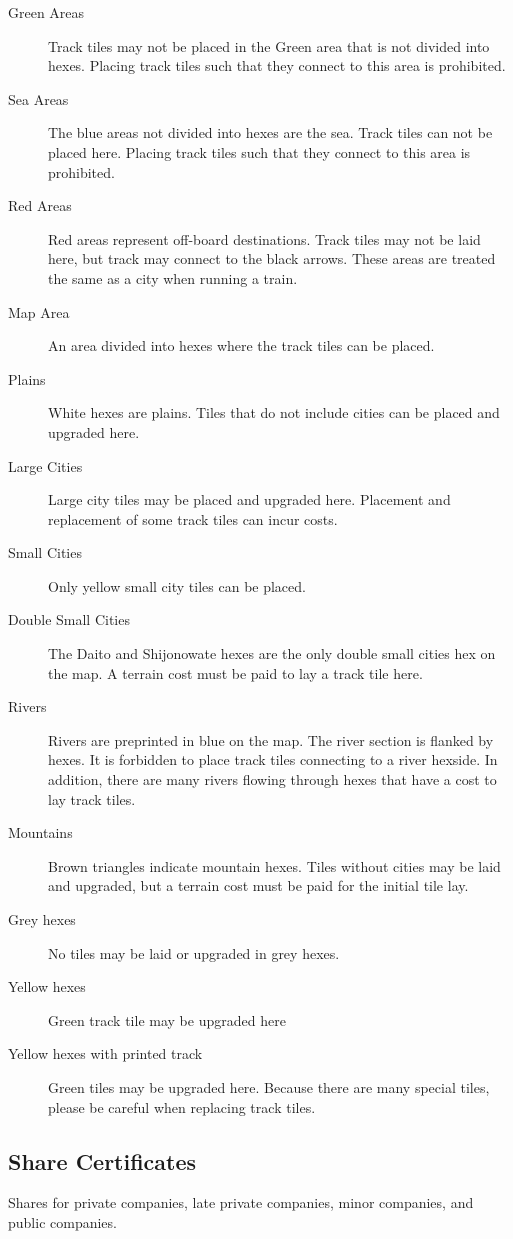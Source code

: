 \documentclass{article}
\begin{document}
\begin{CJK}{UTF8}{min}
\begin{multicols}{2}
\begin{description}
\item[Green Areas] Track tiles may not be placed in the Green area
  that is not divided into hexes. Placing track tiles such
  that they connect to this area is prohibited.
\item[Sea Areas] The blue areas not divided into hexes are the
  sea. Track tiles can not be placed here. Placing track
  tiles such that they connect to this area is prohibited.
\item[Red Areas] Red areas represent off-board destinations. Track
  tiles may not be laid here, but track may connect to the black
  arrows. These areas are treated the same as a city when running a
  train.
\item[Map Area] An area divided into hexes where the track
  tiles can be placed.
\item[Plains] White hexes are plains. Tiles that do not include cities
  can be placed and upgraded here.
\item[Large Cities] Large city tiles may be placed and upgraded
  here. Placement and replacement of some track tiles can incur costs.
\item[Small Cities] Only yellow small city tiles can be placed.
\item[Double Small Cities] The Daito and Shijonowate hexes are the only
  double small cities hex on the map. A terrain cost must be paid to
  lay a track tile here.
\item[Rivers] Rivers are preprinted in blue on the map. The river
  section is flanked by hexes. It is forbidden to place track tiles
  connecting to a river hexside. In addition, there are many rivers flowing
  through hexes that have a cost to lay track tiles.
\item[Mountains] Brown triangles indicate mountain hexes. Tiles
  without cities may be laid and upgraded, but a terrain cost must be
  paid for the initial tile lay.
\item[Grey hexes] No tiles may be laid or upgraded in grey hexes.
\item[Yellow hexes] Green track tile may be upgraded here
\item[Yellow hexes with printed track] Green tiles may be upgraded
  here. Because there are many special tiles, please be careful when
  replacing track tiles.
\end{description}


\subsection{Share Certificates}
Shares for private companies, late private companies, minor companies, and
public companies.



\end{multicols}
\end{CJK}
\end{document}

